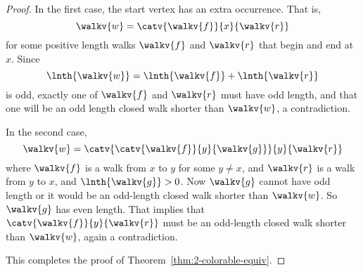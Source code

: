 \begin{description}
\begin{proof}
In the first case, the start vertex has an extra occurrence.  That is,
\[
\walkv{w} = \catv{\walkv{f}}{x}{\walkv{r}}
\]
for some positive length walks $\walkv{f}$ and $\walkv{r}$ that begin and
end at $x$.  Since
\[
\lnth{\walkv{w}} =  \lnth{\walkv{f}}+ \lnth{\walkv{r}}
\]
is odd, exactly one of $\walkv{f}$ and $\walkv{r}$ must have odd length,
and that one will be an odd length closed walk shorter than $\walkv{w}$, a
contradiction.

In the second case,
\[
\walkv{w} = \catv{\catv{\walkv{f}}{y}{\walkv{g}}}{y}{\walkv{r}}
\]
where $\walkv{f}$ is a walk from $x$ to $y$ for some $y \neq x$, and
$\walkv{r}$ is a walk from $y$ to $x$, and $\lnth{\walkv{g}} > 0$.
Now $\walkv{g}$ cannot have odd length or it would be an odd-length
closed walk shorter than $\walkv{w}$.  So $\walkv{g}$ has even length.
That implies that $\catv{\walkv{f}}{y}{\walkv{r}}$ must be an
odd-length closed walk shorter than $\walkv{w}$, again a
contradiction.

This completes the proof of Theorem~\ref{thm:2-colorable-equiv}.
\end{proof}
\end{description}



